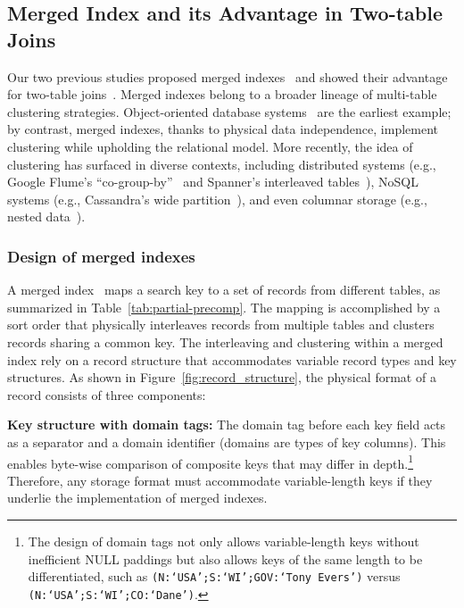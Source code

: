 \documentclass[sigconf, pdfa, nonacm]{acmart}
\begin{document}
\subsection{Merged Index and its Advantage in Two-table Joins}\label{subsec:two_table_merged}

Our two previous studies proposed merged indexes~\cite{graefe2007merged} and showed their advantage for two-table joins~\cite{lyu2025indexing}.
Merged indexes belong to a broader lineage of multi-table clustering strategies.
Object-oriented database systems~\cite{DARMONT199655} are the earliest example; by contrast, merged indexes, thanks to physical data independence, implement clustering while upholding the relational model.
More recently, the idea of clustering has surfaced in diverse contexts, including distributed systems (e.g., Google Flume's ``co-group-by''~\cite{beam2024cogroupbykey} and Spanner's interleaved tables~\cite{spanner13}), NoSQL systems (e.g., Cassandra's wide partition~\cite{carpenter2022cassandra}), and even columnar storage (e.g., nested data~\cite{dremel,Rey2023nested}).

\subsubsection{Design of merged indexes~\cite{graefe2007merged}}
A merged index~\cite{graefe2007merged} maps a search key to a set of records from different tables, as summarized in Table~\ref{tab:partial-precomp}. The mapping is accomplished by a sort order that physically interleaves records from multiple tables and clusters records sharing a common key.
The interleaving and clustering within a merged index rely on a record structure that accommodates variable record types and key structures. As shown in Figure~\ref{fig:record_structure}, the physical format of a record consists of three components:

\textbf{Key structure with domain tags:} The domain tag before each key field acts as a separator and a domain identifier (domains are types of key columns). This enables byte-wise comparison of composite keys that may differ in depth.\footnote{The design of domain tags not only allows variable-length keys without inefficient NULL paddings but also allows keys of the same length to be differentiated, such as \texttt{(N:`USA';S:`WI';GOV:`Tony Evers')} versus \texttt{(N:`USA';S:`WI';CO:`Dane')}.} Therefore, any storage format must accommodate variable-length keys if they underlie the implementation of merged indexes.
\end{document}
